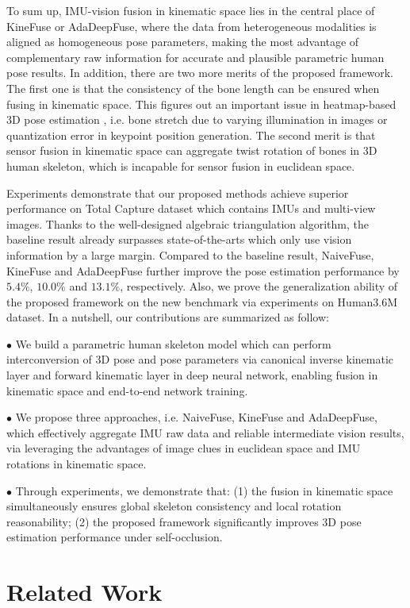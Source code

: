 \documentclass[lettersize,journal]{IEEEtran}
\begin{document}
To sum up, IMU-vision fusion in kinematic space lies in the central place of KineFuse or AdaDeepFuse, where the data from heterogeneous modalities is aligned as homogeneous pose parameters, making the most advantage of complementary raw information for accurate and plausible parametric human pose results. In addition, there are two more merits of the proposed framework. The first one is that the consistency of the bone length can be ensured when fusing in kinematic space. This figures out an important issue in heatmap-based 3D pose estimation \cite{kamel2020hybrid,li2021tokenpose}, i.e. bone stretch due to varying illumination in images or quantization error in keypoint position generation. The second merit is that sensor fusion in kinematic space can aggregate twist rotation of bones in 3D human skeleton, which is incapable for sensor fusion in euclidean space.

Experiments demonstrate that our proposed methods achieve superior performance on Total Capture dataset which contains IMUs and multi-view images. Thanks to the well-designed algebraic triangulation algorithm, the baseline result already surpasses state-of-the-arts which only use vision information by a large margin. Compared to the baseline result, NaiveFuse, KineFuse and AdaDeepFuse further improve the pose estimation performance by $5.4\%$, $10.0\%$ and $13.1\%$, 
respectively. Also, we prove the generalization ability of the proposed framework on the new benchmark via experiments on Human3.6M dataset. In a nutshell, our contributions are summarized as follow:

\indent $\bullet$ We build a parametric human skeleton model which can perform interconversion of 3D pose and pose parameters via canonical inverse kinematic layer and forward kinematic layer in deep neural network, enabling fusion in kinematic space and end-to-end network training.

\indent $\bullet$ We propose three approaches, i.e. NaiveFuse, KineFuse and AdaDeepFuse, which effectively aggregate IMU raw data and reliable intermediate vision results, via leveraging the advantages of image clues in euclidean space and IMU rotations in kinematic space.

\indent $\bullet$ Through experiments, we demonstrate that: (1) the fusion in kinematic space simultaneously ensures global skeleton consistency and local rotation reasonability; (2) the proposed framework significantly improves 3D pose estimation performance under self-occlusion.

\section{Related Work}
 
\end{document}
